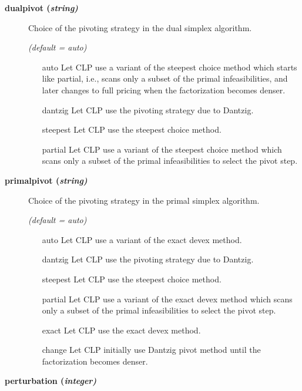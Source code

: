 \begin{description}
\item[\label{dualpivot}\hypertarget{dualpivot}
{\textbf{dualpivot (\slshape{string})}}]\hspace{1.0in}

Choice of the pivoting strategy in the dual simplex algorithm.

\textsl{(default = auto)}
\begin{itemize}
\item[auto] 
Let CLP use a variant of the steepest choice method which starts like partial, i.e., scans only a subset of the primal infeasibilities,
and later changes to full pricing when the factorization becomes denser.
\item[dantzig] 
Let CLP use the pivoting strategy due to Dantzig.
\item[steepest] 
Let CLP use the steepest choice method.
\item[partial] 
Let CLP use a variant of the steepest choice method which scans only a subset of the primal infeasibilities to select the pivot step.
\end{itemize}

\item[\label{primalpivot}\hypertarget{primalpivot}
{\textbf{primalpivot (\slshape{string})}}]\hspace{1.0in}

Choice of the pivoting strategy in the primal simplex algorithm.

\textsl{(default = auto)}
\begin{itemize}
\item[auto] 
Let CLP use a variant of the exact devex method.
\item[dantzig] 
Let CLP use the pivoting strategy due to Dantzig.
\item[steepest] 
Let CLP use the steepest choice method.
\item[partial] 
Let CLP use a variant of the exact devex method which scans only a subset of the primal infeasibilities to select the pivot step.
\item[exact] 
Let CLP use the exact devex method.
\item[change] 
Let CLP initially use Dantzig pivot method until the factorization becomes denser.
\end{itemize}

\item[\label{perturbation}\hypertarget{perturbation}
{\textbf{perturbation (\slshape{integer})}}]\hspace{1.0in}


\end{description}
